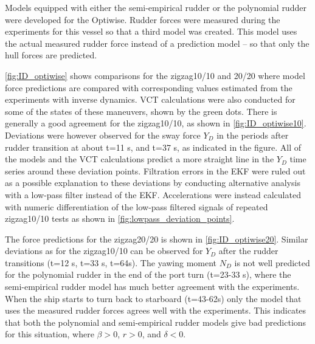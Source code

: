 Models equipped with either the semi-empirical rudder or the polynomial rudder were developed for the Optiwise. Rudder forces were measured during the experiments for this vessel so that a third model was created. This model uses the actual measured rudder force instead of a prediction model -- so that only the hull forces are predicted. 

\autoref{fig:ID_optiwise} shows comparisons for the zigzag10/10 and 20/20 where model force predictions are compared with corresponding values estimated from the experiments with inverse dynamics. VCT calculations were also conducted for some of the states of these maneuvers, shown by the green dots.
There is generally a good agreement for the zigzag10/10, as shown in \autoref{fig:ID_optiwise10}. Deviations were however observed for the sway force $Y_D$ in the periods after rudder transition at about t=11 s, and t=37 s, as indicated in the figure. All of the models and the VCT calculations predict a more straight line in the $Y_D$ time series around these deviation points. 
Filtration errors in the EKF were ruled out as a possible explanation to these deviations by conducting alternative analysis with a low-pass filter instead of the EKF. Accelerations were instead calculated with numeric differentiation of the low-pass filtered signals of repeated zigzag10/10 tests as shown in \autoref{fig:lowpass_deviation_points}.

The force predictions for the zigzag20/20 is shown in \autoref{fig:ID_optiwise20}. Similar deviations as for the zigzag10/10 can be observed for $Y_D$ after the rudder transitions (t=12 s, t=33 s, t=64s). The yawing moment $N_D$ is not well predicted for the polynomial rudder in the end of the port turn (t=23-33 s), where the semi-empirical rudder model has much better agreement with the experiments. When the ship starts to turn back to starboard (t=43-62s) only the model that uses the measured rudder forces agrees well with the experiments. This indicates that both the polynomial and semi-empirical rudder models give bad predictions for this situation, where $\beta>0$, $r>0$, and $\delta<0$. 

